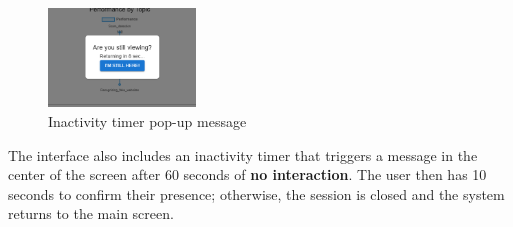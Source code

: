 \begin{figure}[H]
    \centering
    \includegraphics[width=0.35\textwidth]{images/Grading1.png}
    \caption{Inactivity timer pop-up message}
\end{figure}
The interface also includes an inactivity timer that triggers a message in the center of the screen after 60 seconds 
of \textbf{no interaction}. The user then has 10 seconds to confirm their presence; otherwise, the session is closed and the 
system returns to the main screen.